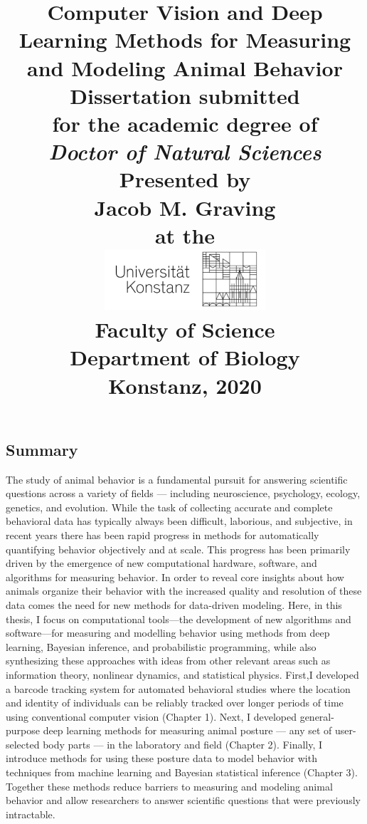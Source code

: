 \documentclass[11pt,a4paper,oneside]{book}
\title{
	\HUGE \textbf{Computer Vision and Deep Learning Methods for Measuring and Modeling Animal Behavior} \\
	\vspace{4cm}
	\Large Dissertation submitted \\
	\Large for the academic degree of \\
	\vspace{0.5cm}
	\Large \textit{Doctor of Natural Sciences} \\

	\vspace{2cm}
    \Large Presented by \\
    \vspace{0.5cm}
    \LARGE Jacob M. Graving \\
    \vspace{0.5cm}
    \Large at the \\
    \vspace{0.1cm}
	\includegraphics[width=6cm]{Graving_IMPRS_Thesis/graphics/uni_logo.png}\\
	\vspace{2cm}
	\Large Faculty of Science \\
	\Large Department of Biology \\
	\vspace{2cm}
	\Large Konstanz, 2020
	\date{}
}
\def\blankpage{%
      \clearpage%
      \thispagestyle{empty}%
      \addtocounter{page}{-1}%
      \null%
      \clearpage}
\begin{document}
	\maketitle
    \blankpage
	\tableofcontents
	\setcounter{page}{1}
\begin{doublespace}
	\chapter*{Summary}
  The study of animal behavior is a fundamental pursuit for answering scientific questions across a variety of fields --- including neuroscience, psychology, ecology, genetics, and evolution. While the task of collecting accurate and complete behavioral data has typically always been difficult, laborious, and subjective, in recent years there has been rapid progress in methods for automatically quantifying behavior objectively and at scale. This progress has been primarily driven by the emergence of new computational hardware, software, and algorithms for measuring behavior. In order to reveal core insights about how animals organize their behavior with the increased quality and resolution of these data comes the need for new methods for data-driven modeling. Here, in this thesis, I focus on computational tools—the development of new algorithms and software—for measuring and modelling behavior using methods from deep learning, Bayesian inference, and probabilistic programming, while also synthesizing these approaches with ideas from other relevant areas such as information theory, nonlinear dynamics, and statistical physics. First,I developed a barcode tracking system for automated behavioral studies where the location and identity of individuals can be reliably tracked over longer periods of time using conventional computer vision (Chapter 1). Next, I developed general-purpose deep learning methods for measuring animal posture --- any set of user-selected body parts --- in the laboratory and field (Chapter 2). Finally, I introduce methods for using these posture data to model behavior with techniques from machine learning and Bayesian statistical inference (Chapter 3). Together these methods reduce barriers to measuring and modeling animal behavior and allow researchers to answer scientific questions that were previously intractable.


\end{doublespace}
\end{document}
